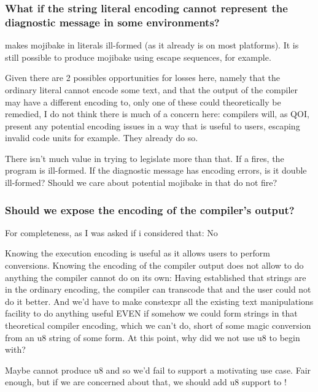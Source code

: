 \documentclass{wg21}
\begin{document}
\subsubsection{What if the string literal encoding cannot represent the diagnostic message in some environments?}

 makes mojibake in literals ill-formed (as it already is on most platforms). It is still possible to produce mojibake using
escape sequences, for example.

Given there are 2 possibles opportunities for losses here, namely that the ordinary literal cannot encode some text, and that the
output of the compiler may have a different encoding to, only one of these could theoretically be remedied, I do not think there is much of a concern here: compilers will, as QOI, present any potential encoding issues in a way that is useful to users, escaping invalid code units for example.
They already do so.

There isn't much value in trying to legislate more than that.
If a  fires, the program is ill-formed. If the diagnostic message has encoding errors, is it double ill-formed?
Should we care about potential mojibake in  that do not fire?

\subsubsection{Should we expose the encoding of the compiler's output?}

For completeness, as I was asked if i considered that: No

Knowing the execution encoding is useful as it allows users to perform conversions.
Knowing the encoding of the compiler output does not allow to do anything the compiler cannot do on its own:
Having established that strings are in the ordinary encoding, the compiler can transcode that and the user could not do it better.
And we'd have to make constexpr all the existing text manipulations facility to do anything useful EVEN if somehow we could form strings in that
theoretical compiler encoding, which we can't do, short of some magic conversion from an u8 string of some form.
At this point, why did we not use u8 to begin with?

Maybe  cannot produce u8 and so we'd fail to support a motivating use case.
Fair enough, but if we are concerned about that, we should add u8 support to  !
\end{document}
